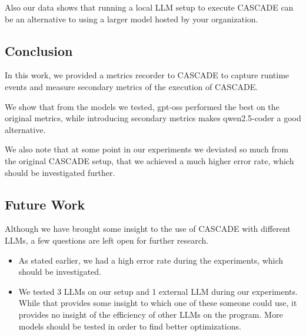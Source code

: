 Also our data shows that running a local LLM setup to execute CASCADE can be an alternative to using a larger model hosted by your organization.

\subsection{Conclusion}
\label{sec:conclusion}

In this work, we provided a metrics recorder to CASCADE to capture runtime events and measure secondary metrics of the execution of CASCADE.

We show that from the models we tested, gpt-oss performed the best on the original metrics,
while introducing secondary metrics makes qwen2.5-coder a good alternative.

We also note that at some point in our experiments we deviated so much from the original CASCADE setup, that we achieved a much higher error rate, which should be investigated further.
\subsection{Future Work}
\label{sec:future-work}

Although we have brought some insight to the use of CASCADE with different LLMs, a few questions are left open for further research.
\begin{itemize}
    \item As stated earlier, we had a high error rate during the experiments, which should be investigated.
    \item We tested 3 LLMs on our setup and 1 external LLM during our experiments.
        While that provides some insight to which one of these someone could use, it provides no insight of the efficiency of other LLMs on the program.
        More models should be tested in order to find better optimizations.
\end{itemize}
